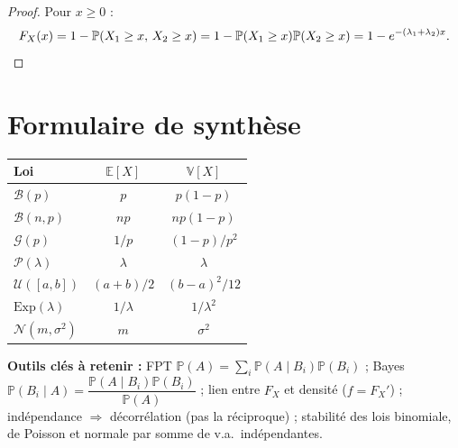 \documentclass[11pt,a4paper]{article}
\newcommand{\E}{\mathbb{E}}
\newcommand{\V}{\mathbb{V}}
\renewcommand{\P}{\mathbb{P}}
\newcommand{\1}{\mathbf{1}}
\begin{document}
\begin{proof}
Pour $x\ge0$ :
\[
F_X(x)=1-\P(X_1\ge x,\,X_2\ge x)=1-\P(X_1\ge x)\P(X_2\ge x)=1-e^{-(\lambda_1+\lambda_2)x}.\qedhere
\]
\end{proof}

\section{Formulaire de synthèse}

\begin{center}
\begin{tabular}{lcc}
\toprule
\textbf{Loi} & $\E[X]$ & $\V[X]$\\
\midrule
$\mathcal{B}(p)$ & $p$ & $p(1-p)$\\
$\mathcal{B}(n,p)$ & $np$ & $np(1-p)$\\
$\mathcal{G}(p)$ & $1/p$ & $(1-p)/p^2$\\
$\mathcal{P}(\lambda)$ & $\lambda$ & $\lambda$\\
$\mathcal{U}([a,b])$ & $(a+b)/2$ & $(b-a)^2/12$\\
$\mathrm{Exp}(\lambda)$ & $1/\lambda$ & $1/\lambda^2$\\
$\mathcal{N}(m,\sigma^2)$ & $m$ & $\sigma^2$\\
\bottomrule
\end{tabular}
\end{center}

\noindent\textbf{Outils clés à retenir :} FPT $\P(A)=\sum_i\P(A\mid B_i)\P(B_i)$ ; Bayes $\P(B_i\mid A)=\dfrac{\P(A\mid B_i)\P(B_i)}{\P(A)}$ ; lien entre $F_X$ et densité ($f=F_X'$) ; indépendance $\Rightarrow$ décorrélation (pas la réciproque) ; stabilité des lois binomiale, de Poisson et normale par somme de v.a.\ indépendantes.
\end{document}
